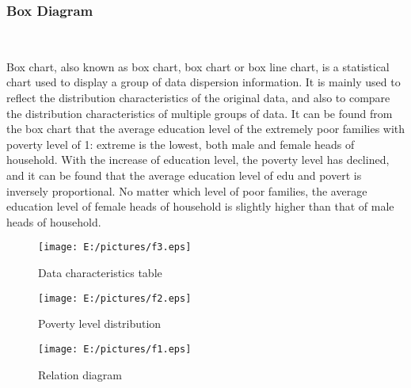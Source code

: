 \subsubsection{Box Diagram}
\

Box chart, also known as box chart, box chart or box line chart, is a statistical chart used to display a group of data dispersion information. It is mainly used to reflect the distribution characteristics of the original data, and also to compare the distribution characteristics of multiple groups of data. It can be found from the box chart that the average education level of the extremely poor families with poverty level of 1: extreme is the lowest, both male and female heads of household. With the increase of education level, the poverty level has declined, and it can be found that the average education level of edu and povert is inversely proportional. No matter which level of poor families, the average education level of female heads of household is slightly higher than that of male heads of household.


\begin{figure}[htbp]
	\centering
	
	\texttt{[image: E:/pictures/f3.eps]}
	\caption{Data characteristics table}\label{fig:f3.eps}
\end{figure}

\begin{figure}[htbp]
	\centering
	
	\texttt{[image: E:/pictures/f2.eps]}%
	\caption{Poverty level distribution}\label{fig:f2.eps}
\end{figure}

\begin{figure}[htbp]
	\centering
	
	\texttt{[image: E:/pictures/f1.eps]}
	\caption{Relation diagram}\label{fig:f1.eps}
\end{figure}
	

	
